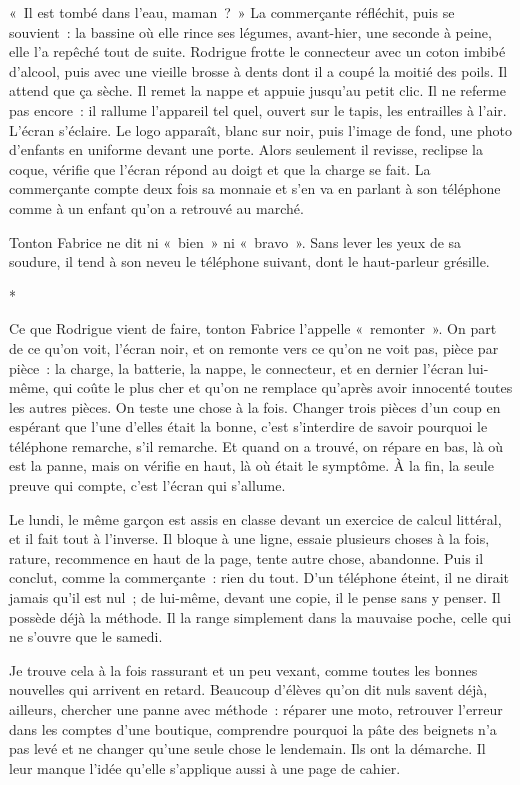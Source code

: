 \documentclass[10.5pt,twoside,openright]{book}
\newcommand{\asterisme}{\par\vspace{0.7em}\centerline{\color{gris}*\quad*\quad*}\vspace{0.7em}\par\noindent}
\begin{document}
« Il est tombé dans l’eau, maman ? » La commerçante réfléchit, puis se souvient : la bassine où elle rince ses légumes, avant-hier, une seconde à peine, elle l’a repêché tout de suite. Rodrigue frotte le connecteur avec un coton imbibé d’alcool, puis avec une vieille brosse à dents dont il a coupé la moitié des poils. Il attend que ça sèche. Il remet la nappe et appuie jusqu’au petit clic. Il ne referme pas encore : il rallume l’appareil tel quel, ouvert sur le tapis, les entrailles à l’air. L’écran s’éclaire. Le logo apparaît, blanc sur noir, puis l’image de fond, une photo d’enfants en uniforme devant une porte. Alors seulement il revisse, reclipse la coque, vérifie que l’écran répond au doigt et que la charge se fait. La commerçante compte deux fois sa monnaie et s’en va en parlant à son téléphone comme à un enfant qu’on a retrouvé au marché.

Tonton Fabrice ne dit ni « bien » ni « bravo ». Sans lever les yeux de sa soudure, il tend à son neveu le téléphone suivant, dont le haut-parleur grésille.

\asterisme

Ce que Rodrigue vient de faire, tonton Fabrice l’appelle « remonter ». On part de ce qu’on voit, l’écran noir, et on remonte vers ce qu’on ne voit pas, pièce par pièce : la charge, la batterie, la nappe, le connecteur, et en dernier l’écran lui-même, qui coûte le plus cher et qu’on ne remplace qu’après avoir innocenté toutes les autres pièces. On teste une chose à la fois. Changer trois pièces d’un coup en espérant que l’une d’elles était la bonne, c’est s’interdire de savoir pourquoi le téléphone remarche, s’il remarche. Et quand on a trouvé, on répare en bas, là où est la panne, mais on vérifie en haut, là où était le symptôme. À la fin, la seule preuve qui compte, c’est l’écran qui s’allume.

Le lundi, le même garçon est assis en classe devant un exercice de calcul littéral, et il fait tout à l’inverse. Il bloque à une ligne, essaie plusieurs choses à la fois, rature, recommence en haut de la page, tente autre chose, abandonne. Puis il conclut, comme la commerçante : rien du tout. D’un téléphone éteint, il ne dirait jamais qu’il est nul ; de lui-même, devant une copie, il le pense sans y penser. Il possède déjà la méthode. Il la range simplement dans la mauvaise poche, celle qui ne s’ouvre que le samedi.

Je trouve cela à la fois rassurant et un peu vexant, comme toutes les bonnes nouvelles qui arrivent en retard. Beaucoup d’élèves qu’on dit nuls savent déjà, ailleurs, chercher une panne avec méthode : réparer une moto, retrouver l’erreur dans les comptes d’une boutique, comprendre pourquoi la pâte des beignets n’a pas levé et ne changer qu’une seule chose le lendemain. Ils ont la démarche. Il leur manque l’idée qu’elle s’applique aussi à une page de cahier.
\end{document}
